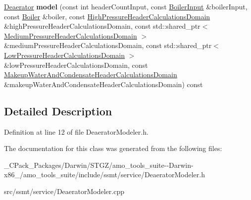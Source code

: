 \begin{DoxyCompactItemize}
\item 
\mbox{\label{class_deaerator_modeler_ad486a9883b3107662101bb5ae7580581}} 
\hyperlink{class_deaerator}{Deaerator} {\bfseries model} (const int header\+Count\+Input, const \hyperlink{class_boiler_input}{Boiler\+Input} \&boiler\+Input, const \hyperlink{class_boiler}{Boiler} \&boiler, const \hyperlink{class_high_pressure_header_calculations_domain}{High\+Pressure\+Header\+Calculations\+Domain} \&high\+Pressure\+Header\+Calculations\+Domain, const std\+::shared\+\_\+ptr$<$ \hyperlink{class_medium_pressure_header_calculations_domain}{Medium\+Pressure\+Header\+Calculations\+Domain} $>$ \&medium\+Pressure\+Header\+Calculations\+Domain, const std\+::shared\+\_\+ptr$<$ \hyperlink{class_low_pressure_header_calculations_domain}{Low\+Pressure\+Header\+Calculations\+Domain} $>$ \&low\+Pressure\+Header\+Calculations\+Domain, const \hyperlink{class_makeup_water_and_condensate_header_calculations_domain}{Makeup\+Water\+And\+Condensate\+Header\+Calculations\+Domain} \&makeup\+Water\+And\+Condensate\+Header\+Calculations\+Domain) const
\end{DoxyCompactItemize}


\subsection{Detailed Description}


Definition at line 12 of file Deaerator\+Modeler.\+h.



The documentation for this class was generated from the following files\+:\begin{DoxyCompactItemize}
\item 
\+\_\+\+C\+Pack\+\_\+\+Packages/\+Darwin/\+S\+T\+G\+Z/amo\+\_\+tools\+\_\+suite-\/-\/\+Darwin-\/x86\+\_/amo\+\_\+tools\+\_\+suite/include/ssmt/service/Deaerator\+Modeler.\+h\item 
src/ssmt/service/Deaerator\+Modeler.\+cpp\end{DoxyCompactItemize}
